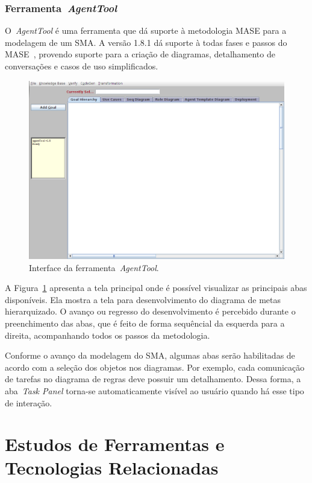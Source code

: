 \subsubsection{Ferramenta~\emph{AgentTool}}

O~\emph{AgentTool} é uma ferramenta que dá suporte à metodologia MASE para a modelagem de um SMA. A versão 1.8.1 dá suporte à todas fases e passos do MASE~\cite{agentTool2012}, provendo suporte para a criação de diagramas, detalhamento de conversações e casos de uso simplificados.

\begin{figure}
	\centering
	\includegraphics[scale=0.4]{images/interface-agent-tool.png}
	\caption{Interface da ferramenta~\emph{AgentTool}.}
	\label{fig:interface-agent-tool}
\end{figure}

A Figura~\ref{fig:interface-agent-tool} apresenta a tela principal onde é possível visualizar as principais abas disponíveis. Ela mostra a tela para desenvolvimento do diagrama de metas hierarquizado. O avanço ou regresso do desenvolvimento é percebido durante o preenchimento das abas, que é feito de forma sequêncial da esquerda para a direita, acompanhando todos os passos da metodologia.

Conforme o avanço da modelagem do SMA, algumas abas serão habilitadas de acordo com a seleção dos objetos nos diagramas. Por exemplo, cada comunicação de tarefas no diagrama de regras deve possuir um detalhamento. Dessa forma, a aba~\emph{Task Panel} torna-se automaticamente visível ao usuário quando há esse tipo de interação.

\section{Estudos de Ferramentas e Tecnologias Relacionadas}\label{section:ferramentas}

